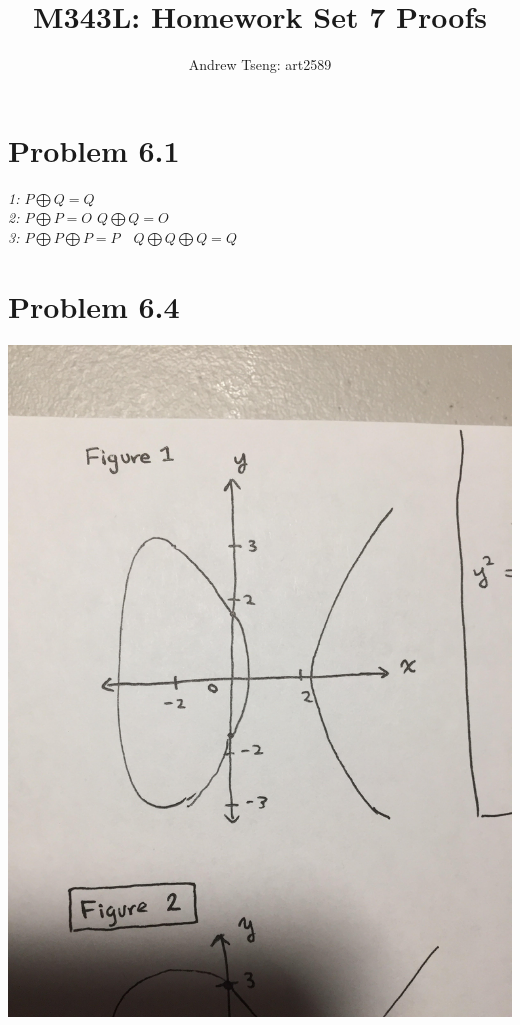 \documentclass[10pt]{amsart}
\title{\LARGE M343L: Homework Set 7 Proofs}
\author{Andrew Tseng: art2589}
\begin{document}
\maketitle
\thispagestyle{empty}

\section*{\small Problem 6.1}
\textit{1: $P \bigoplus Q = Q$ } \\
\indent\textit{2: $P \bigoplus P = O$ \quad $Q \bigoplus Q = O$ } \\
\indent\textit{3: $P \bigoplus P \bigoplus P = P \quad Q \bigoplus Q \bigoplus Q = Q$ }\\

\section*{\small Problem 6.4}
\includegraphics[scale=0.08]{graphs1}
\end{document}
